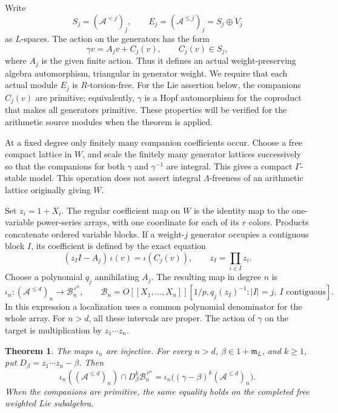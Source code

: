 \documentclass[11pt]{article}
\newtheorem{theorem}{Theorem}[section]
\theoremstyle{definition}\newtheorem{definition}[theorem]{Definition}
\begin{document}
Write
\[
 S_j=(\mathcal A^{<j})_j,\qquad
 E_j=(\mathcal A^{\leq j})_j=S_j\oplus V_j
\]
as \(L\)-spaces.  The action on the generators has the form
\begin{equation}\label{eq:wcs-action}
 \gamma v=A_jv+C_j(v),\qquad C_j(v)\in S_j,
\end{equation}
where \(A_j\) is the given finite action.  Thus it defines an actual
weight-preserving algebra automorphism, triangular in generator
weight.  We require that each actual module \(E_j\) is \(R\)-torsion-free.
For the Lie assertion below, the companions \(C_j(v)\) are primitive;
equivalently, \(\gamma\) is a Hopf automorphism for the coproduct that
makes all generators primitive.  These properties will be verified
for the arithmetic source modules when the theorem is applied.

At a fixed degree only finitely many companion coefficients occur.
Choose a free compact lattice in \(W\), and scale the finitely many
generator lattices successively so that the companions for both
\(\gamma\) and \(\gamma^{-1}\) are integral.  This gives a compact
\(\Gamma\)-stable model.  This operation does not assert integral
\(\Lambda\)-freeness of an arithmetic lattice originally giving \(W\).

Set \(z_i=1+X_i\).  The regular coefficient map on \(W\) is the
identity map to the one-variable power-series arrays, with one
coordinate for each of its \(r\) colors.  Products concatenate
ordered variable blocks.  If a weight-\(j\) generator occupies a
contiguous block \(I\), its coefficient is defined by the exact
equation
\begin{equation}\label{eq:wcs-resolvent}
 (z_I I-A_j)\,\iota(v)=\iota(C_j(v)),
 \qquad z_I=\prod_{i\in I}z_i.
\end{equation}
Choose a polynomial \(q_j\) annihilating \(A_j\).  The resulting map in
degree \(n\) is
\[
 \iota_n:(\mathcal A^{\leq d})_n
 \longrightarrow \mathcal B_n^{\,r^n},\qquad
 \mathcal B_n=
 O[[X_1,\ldots,X_n]]
 [1/p,q_j(z_I)^{-1}:|I|=j,\ I\text{ contiguous}].
\]
In this expression a localization uses a common polynomial
denominator for the whole array.  For \(n>d\), all these intervals
are proper.  The action of \(\gamma\) on the target is multiplication
by \(z_1\cdots z_n\).

\begin{theorem}\label{thm:weighted-companion-saturation}
The maps \(\iota_n\) are injective.  For every \(n>d\),
\(\beta\in1+\mathfrak m_L\), and \(k\geq1\), put
\(D_\beta=z_1\cdots z_n-\beta\).  Then
\begin{equation}\label{eq:wcs-saturation}
 \iota_n((\mathcal A^{\leq d})_n)
       \cap D_\beta^k\mathcal B_n^{\,r^n}
 =\iota_n\bigl((\gamma-\beta)^k
                       (\mathcal A^{\leq d})_n\bigr).
\end{equation}
When the companions are primitive, the same equality holds on
the completed free weighted Lie subalgebra.
\end{theorem}
\end{document}
